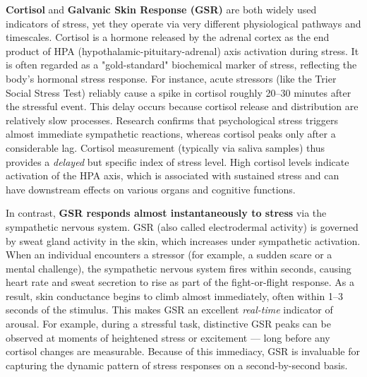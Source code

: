 \textbf{Cortisol} and \textbf{Galvanic Skin Response (GSR)} are both widely used indicators of stress, yet they operate via very different physiological pathways and timescales. Cortisol is a hormone released by the adrenal cortex as the end product of HPA (hypothalamic-pituitary-adrenal) axis activation during stress. It is often regarded as a "gold-standard" biochemical marker of stress, reflecting the body's hormonal stress response. For instance, acute stressors (like the Trier Social Stress Test) reliably cause a spike in cortisol roughly 20–30 minutes after the stressful event\cite{CortisolStressIndicator2020}. This delay occurs because cortisol release and distribution are relatively slow processes. Research confirms that psychological stress triggers almost immediate sympathetic reactions, whereas cortisol peaks only after a considerable lag\cite{CortisolStressIndicator2020}. Cortisol measurement (typically via saliva samples) thus provides a \textit{delayed} but specific index of stress level. High cortisol levels indicate activation of the HPA axis, which is associated with sustained stress and can have downstream effects on various organs and cognitive functions.

In contrast, \textbf{GSR responds almost instantaneously to stress} via the sympathetic nervous system. GSR (also called electrodermal activity) is governed by sweat gland activity in the skin, which increases under sympathetic activation. When an individual encounters a stressor (for example, a sudden scare or a mental challenge), the sympathetic nervous system fires within seconds, causing heart rate and sweat secretion to rise as part of the fight-or-flight response\cite{CortisolStressIndicator2020}. As a result, skin conductance begins to climb almost immediately, often within 1–3 seconds of the stimulus\cite{ElectrodermalActivityWiki}. This makes GSR an excellent \textit{real-time} indicator of arousal. For example, during a stressful task, distinctive GSR peaks can be observed at moments of heightened stress or excitement — long before any cortisol changes are measurable\cite{CortisolStressIndicator2020}. Because of this immediacy, GSR is invaluable for capturing the dynamic pattern of stress responses on a second-by-second basis.

